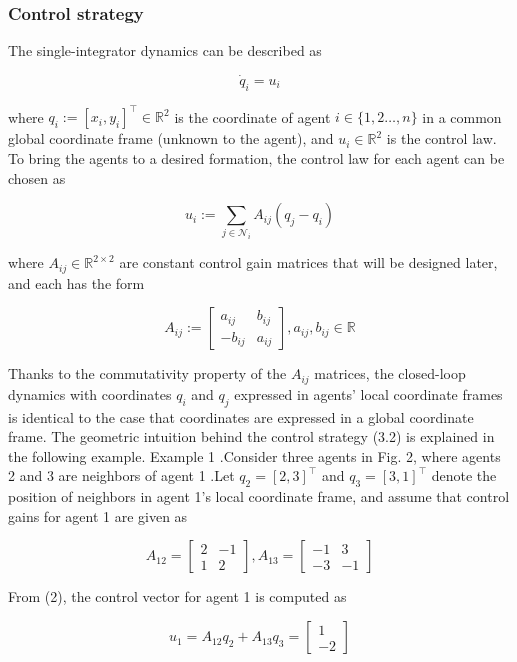 \documentclass[10pt]{article}
\begin{document}
\subsubsection{Control strategy}
The single-integrator dynamics can be described as

$$
\dot{q}_{i}=u_{i}
$$

where $q_{i}:=\left[x_{i}, y_{i}\right]^{\top} \in \mathbb{R}^{2}$ is the coordinate of agent $i \in\{1,2 \ldots, n\}$ in a common global coordinate frame (unknown to the agent), and $u_{i} \in \mathbb{R}^{2}$ is the control law. To bring the agents to a desired formation, the control law for each agent can be chosen as

$$
u_{i}:=\sum_{j \in \mathcal{N}_{i}} A_{i j}\left(q_{j}-q_{i}\right)
$$

where $A_{i j} \in \mathbb{R}^{2 \times 2}$ are constant control gain matrices that will be designed later, and each has the form

$$
A_{i j}:=\left[\begin{array}{cc}
a_{i j} & b_{i j} \\
-b_{i j} & a_{i j}
\end{array}\right], a_{i j}, b_{i j} \in \mathbb{R}
$$

Thanks to the commutativity property of the $A_{i j}$ matrices, the closed-loop dynamics with coordinates $q_{i}$ and $q_{j}$ expressed in agents' local coordinate frames is identical to the case that coordinates are expressed in a global coordinate frame. The geometric intuition behind the control strategy (3.2) is explained in the following example. Example 1 .Consider three agents in Fig. 2, where agents 2 and 3 are neighbors of agent 1 .Let $q_{2}=[2,3]^{\top}$ and $q_{3}=[3,1]^{\top}$ denote the position of neighbors in agent 1's local coordinate frame, and assume that control gains for agent 1 are given as

$$
A_{12}=\left[\begin{array}{cc}
2 & -1 \\
1 & 2
\end{array}\right], A_{13}=\left[\begin{array}{cc}
-1 & 3 \\
-3 & -1
\end{array}\right]
$$

From (2), the control vector for agent 1 is computed as

$$
u_{1}=A_{12} q_{2}+A_{13} q_{3}=\left[\begin{array}{c}
1 \\
-2
\end{array}\right]
$$
\end{document}
